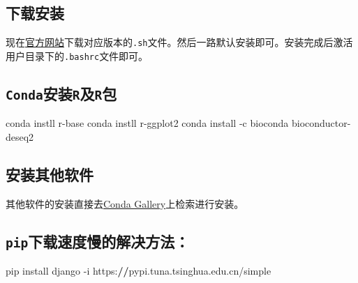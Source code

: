 \documentclass[
  10pt,
]{book}
\newenvironment{Shaded}{\begin{snugshade}}{\end{snugshade}}
\newcommand{\ErrorTok}[1]{\textcolor[rgb]{0.64,0.00,0.00}{\textbf{#1}}}
\newcommand{\NormalTok}[1]{#1}
\newcommand{\SpecialCharTok}[1]{\textcolor[rgb]{0.00,0.00,0.00}{#1}}
\begin{document}
\hypertarget{ux4e0bux8f7dux5b89ux88c5}{%
\subsection{下载安装}\label{ux4e0bux8f7dux5b89ux88c5}}

现在\href{https://docs.conda.io/projects/conda/en/latest/user-guide/install/download.html}{官方网站}下载对应版本的\texttt{.sh}文件。然后一路默认安装即可。安装完成后激活用户目录下的\texttt{.bashrc}文件即可。

\hypertarget{condaux5b89ux88c5rux53carux5305}{%
\subsection{\texorpdfstring{\texttt{Conda}安装\texttt{R}及\texttt{R}包}{Conda安装R及R包}}\label{condaux5b89ux88c5rux53carux5305}}

\begin{Shaded}
\begin{Highlighting}[]
\NormalTok{conda instll r}\SpecialCharTok{{-}}\NormalTok{base}
\NormalTok{conda instll r}\SpecialCharTok{{-}}\NormalTok{ggplot2}
\NormalTok{conda install }\SpecialCharTok{{-}}\NormalTok{c bioconda bioconductor}\SpecialCharTok{{-}}\NormalTok{deseq2}
\end{Highlighting}
\end{Shaded}

\hypertarget{ux5b89ux88c5ux5176ux4ed6ux8f6fux4ef6}{%
\subsection{安装其他软件}\label{ux5b89ux88c5ux5176ux4ed6ux8f6fux4ef6}}

其他软件的安装直接去\href{https://anaconda.org/gallery}{Conda Gallery}上检索进行安装。

\hypertarget{pipux4e0bux8f7dux901fux5ea6ux6162ux7684ux89e3ux51b3ux65b9ux6cd5}{%
\subsection{\texorpdfstring{\texttt{pip}下载速度慢的解决方法：}{pip下载速度慢的解决方法：}}\label{pipux4e0bux8f7dux901fux5ea6ux6162ux7684ux89e3ux51b3ux65b9ux6cd5}}

\begin{Shaded}
\begin{Highlighting}[]
\NormalTok{pip install django }\SpecialCharTok{{-}}\NormalTok{i https}\SpecialCharTok{:}\ErrorTok{//}\NormalTok{pypi.tuna.tsinghua.edu.cn}\SpecialCharTok{/}\NormalTok{simple}
\end{Highlighting}
\end{Shaded}
\end{document}
